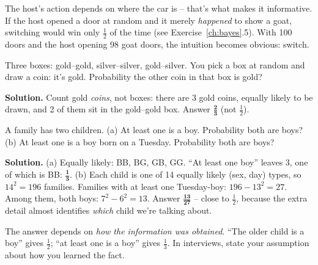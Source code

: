 \documentclass[11pt,a4paper,openany]{report}
\begin{document}
\begin{why}
The host's action depends on where the car is -- that's what makes it informative. If the host opened a door at random and it merely \emph{happened} to show a goat, switching would win only $\frac12$ of the time (see Exercise~\ref{ch:bayes}.5). With 100 doors and the host opening 98 goat doors, the intuition becomes obvious: switch.
\end{why}

\begin{example}
Three boxes: gold--gold, silver--silver, gold--silver. You pick a box at random and draw a coin: it's gold. Probability the other coin in that box is gold?

\textbf{Solution.} Count gold \emph{coins}, not boxes: there are 3 gold coins, equally likely to be drawn, and 2 of them sit in the gold--gold box. Answer $\mathbf{\frac23}$ (not $\frac12$).
\end{example}

\begin{example}
A family has two children.
(a) At least one is a boy. Probability both are boys?
(b) At least one is a boy born on a Tuesday. Probability both are boys?

\textbf{Solution.} (a) Equally likely: BB, BG, GB, GG. ``At least one boy'' leaves 3, one of which is BB: $\mathbf{\frac13}$.
(b) Each child is one of 14 equally likely (sex, day) types, so $14^2=196$ families. Families with at least one Tuesday-boy: $196-13^2=27$. Among them, both boys: $7^2-6^2=13$. Answer $\mathbf{\frac{13}{27}}$ -- close to $\frac12$, because the extra detail almost identifies \emph{which} child we're talking about.
\end{example}

\begin{trap}
The answer depends on \emph{how the information was obtained}. ``The older child is a boy'' gives $\frac12$; ``at least one is a boy'' gives $\frac13$. In interviews, state your assumption about how you learned the fact.
\end{trap}
\end{document}
